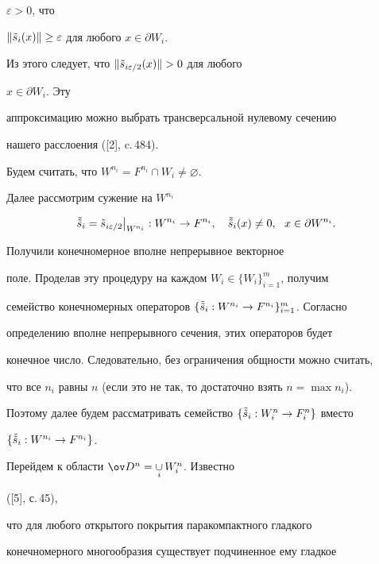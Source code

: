 $\varepsilon>0$, что 


$\|\Tilde s_i(x)\|\ge\varepsilon$ для любого $x\in\partial W_i$. 


Из этого следует, что $\|\Tilde s_{i\varepsilon/2}(x)\|>0$ для любого 


$x\in\partial W_i$. Эту 


аппроксимацию можно выбрать трансверсальной нулевому сечению 


нашего расслоения ([2], c.\,484). 


 


Будем считать, что $W^{n_i}=F^{n_i}\cap W_i\ne\varnothing$. 


Далее рассмотрим сужение на $W^{n_i}$ 


$$ 


\Tilde{\Tilde s}_i=\Tilde s_{i\varepsilon/2}\big|_{W^{n_i}} 


:W^{n_i}\to F^{n_i},\quad \Tilde{\Tilde s}_i(x)\ne0,\ \ 


x\in\partial W^{n_i}. 


$$ 


Получили конечномерное вполне непрерывное векторное 


поле. Проделав эту процедуру на каждом $W_i\in\{W_i\}^m_{i=1}$, получим 


семейство конечномерных операторов $\{\Tilde{\Tilde s}_i:W^{n_i}\to 


F^{n_i}\}^m_{i=1}$. Согласно 


определению вполне непрерывного сечения, этих операторов будет 


конечное число. Следовательно, без ограничения общности можно считать, 


что все $n_i$ равны $n$ (если это не так, то достаточно взять $n=\max 


n_i$). 


Поэтому далее будем рассматривать семейство $\{\Tilde{\Tilde 


s}_i:W^n_i\to F^n_i\}$ вместо 


$\{\Tilde{\Tilde s}_i:W^{n_i}\to F^{n_i}\}$. 


 


Перейдем к области $\ov D{}^n=\mathop{\cup}\limits_i W^n_i$. Известно 


([5], с.\,45), 


что для любого открытого покрытия паракомпактного гладкого 


конечномерного многообразия существует подчиненное ему гладкое 


